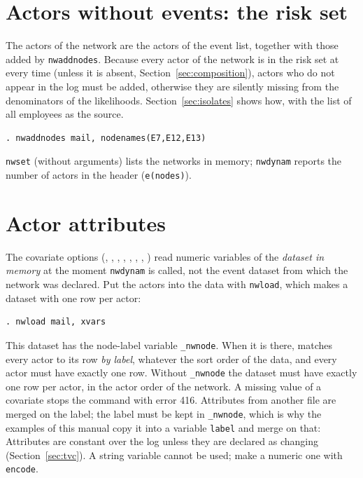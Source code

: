 \section{Actors without events: the risk set}\label{sec:isolates2}

The actors of the network are the actors of the event list, together with those added by \texttt{nwaddnodes}. Because every actor of the network is in the risk set at every time (unless it is absent, Section~\ref{sec:composition}), actors who do not appear in the log must be added, otherwise they are silently missing from the denominators of the likelihoods. Section~\ref{sec:isolates} shows how, with the list of all employees as the source.
\begin{lstlisting}
. nwaddnodes mail, nodenames(E7,E12,E13)
\end{lstlisting}
\texttt{nwset} (without arguments) lists the networks in memory; \texttt{nwdynam} reports the number of actors in the header (\texttt{e(nodes)}).

\section{Actor attributes}\label{sec:attributes}

The covariate options (, , , , , , , ) read numeric variables of the \emph{dataset in memory} at the moment \texttt{nwdynam} is called, not the event dataset from which the network was declared. Put the actors into the data with \texttt{nwload}, which makes a dataset with one row per actor:
\begin{lstlisting}
. nwload mail, xvars
\end{lstlisting}
This dataset has the node-label variable \texttt{\_nwnode}. When it is there, \nwdynam{} matches every actor to its row \emph{by label}, whatever the sort order of the data, and every actor must have exactly one row. Without \texttt{\_nwnode} the dataset must have exactly one row per actor, in the actor order of the network. A missing value of a covariate stops the command with error 416. Attributes from another file are merged on the label; the label must be kept in \texttt{\_nwnode}, which is why the examples of this manual copy it into a variable \texttt{label} and merge on that:
Attributes are constant over the log unless they are declared as changing (Section~\ref{sec:tvc}). A string variable cannot be used; make a numeric one with \texttt{encode}.

